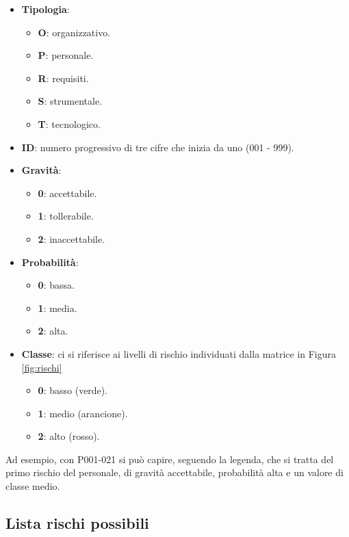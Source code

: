 	\begin{itemize}
		\item \textbf{Tipologia}:
			\begin{itemize}
				\item \textbf{O}: organizzativo.
				\item \textbf{P}: personale.
				\item \textbf{R}: requisiti.
				\item \textbf{S}: strumentale.
				\item \textbf{T}: tecnologico.
			\end{itemize}

		\item \textbf{ID}: numero progressivo di tre cifre che inizia da uno (001 - 999).
		\item \textbf{Gravità}:
			\begin{itemize}
				\item \textbf{0}: accettabile.
				\item \textbf{1}: tollerabile.
				\item \textbf{2}: inaccettabile.
			\end{itemize}

		\item \textbf{Probabilità}:
			\begin{itemize}
				\item \textbf{0}: bassa.
				\item \textbf{1}: media.
				\item \textbf{2}: alta.
			\end{itemize}

		\item \textbf{Classe}: ci si riferisce ai livelli di rischio individuati dalla matrice in Figura \ref{fig:rischi}
			\begin{itemize}
				\item \textbf{0}: basso (verde).
				\item \textbf{1}: medio (arancione).
				\item \textbf{2}: alto (rosso).
			\end{itemize}
	\end{itemize}

	Ad esempio, con P001-021 si può capire, seguendo la legenda, che si tratta del primo rischio del personale, di gravità accettabile, probabilità alta e un valore
	di classe medio.

	\subsection{Lista rischi possibili}

